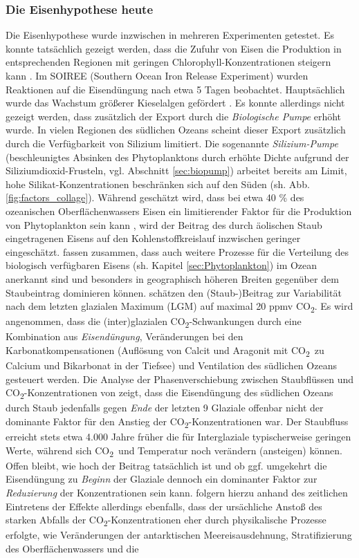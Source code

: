 \documentclass[12pt,a4paper,onecolumn,headheight=30pt]{scrartcl}
\newcommand{\cotwo}{CO\textsubscript{2}}
\begin{document}
\subsubsection{Die Eisenhypothese heute}
Die Eisenhypothese wurde inzwischen in mehreren Experimenten getestet. Es konnte tatsächlich gezeigt werden, dass die Zufuhr von Eisen die Produktion in entsprechenden Regionen mit geringen Chlorophyll-Konzentrationen steigern kann \citep{Boyd.2007}. Im SOIREE (Southern Ocean Iron Release Experiment) wurden Reaktionen auf die Eisendüngung nach etwa 5 Tagen beobachtet. Hauptsächlich wurde das Wachstum größerer Kieselalgen gefördert \citep{Trull.2001}. Es konnte allerdings nicht gezeigt werden, dass zusätzlich der Export durch die \textit{Biologische Pumpe} erhöht wurde. In vielen Regionen des südlichen Ozeans scheint dieser Export zusätzlich durch die Verfügbarkeit von Silizium limitiert. Die sogenannte \textit{Silizium-Pumpe} (beschleunigtes Absinken des Phytoplanktons durch erhöhte Dichte aufgrund der Siliziumdioxid-Frusteln, vgl. Abschnitt \ref{sec:biopump}) arbeitet bereits am Limit, hohe Silikat-Konzentrationen beschränken sich auf den Süden (sh. Abb. \ref{fig:factors_collage}). Während geschätzt wird, dass bei etwa 40 \% des ozeanischen Oberflächenwassers Eisen ein limitierender Faktor für die Produktion von Phytoplankton sein kann \citep{Emerson.2009}, wird der Beitrag des durch äolischen Staub eingetragenen Eisens auf den Kohlenstoffkreislauf inzwischen geringer eingeschätzt. \citet{Tagliabue.2017} fassen zusammen, dass auch weitere Prozesse für die Verteilung des biologisch verfügbaren Eisens (sh. Kapitel \ref{sec:Phytoplankton}) im Ozean anerkannt sind und besonders in geographisch höheren Breiten gegenüber dem Staubeintrag dominieren können. \citet{Vallelonga.2013} schätzen den (Staub-)Beitrag zur Variabilität nach dem letzten glazialen Maximum (LGM) auf maximal 20 ppmv \cotwo . Es wird angenommen, dass die (inter)glazialen \cotwo -Schwankungen durch eine Kombination aus \textit{Eisendüngung}, Veränderungen bei den Karbonatkompensationen (Auflösung von Calcit und Aragonit mit  \cotwo \ zu Calcium und Bikarbonat in der Tiefsee) und Ventilation des südlichen Ozeans \citep{Lambert.2012} gesteuert werden. Die Analyse der Phasenverschiebung zwischen Staubflüssen und \cotwo -Konzentrationen von \citet{Lambert.2012} zeigt, dass die Eisendüngung des südlichen Ozeans durch Staub jedenfalls gegen \textit{Ende} der letzten 9 Glaziale offenbar nicht der dominante Faktor für den Anstieg der \cotwo -Konzentrationen war. Der Staubfluss erreicht stets etwa 4.000 Jahre früher die für Interglaziale typischerweise  geringen Werte, während sich \cotwo \ und Temperatur noch verändern (ansteigen) können. Offen bleibt, wie hoch der Beitrag tatsächlich ist und ob ggf. umgekehrt die Eisendüngung zu \textit{Beginn} der Glaziale dennoch ein dominanter Faktor zur \textit{Reduzierung} der Konzentrationen sein kann. \citet{MartinezGarcia.2009} folgern hierzu anhand des zeitlichen Eintretens der Effekte allerdings ebenfalls, dass der ursächliche Anstoß des starken Abfalls der \cotwo -Konzentrationen eher durch physikalische Prozesse erfolgte, wie Veränderungen der antarktischen Meereisausdehnung, Stratifizierung des Oberflächenwassers und die 
\end{document}
